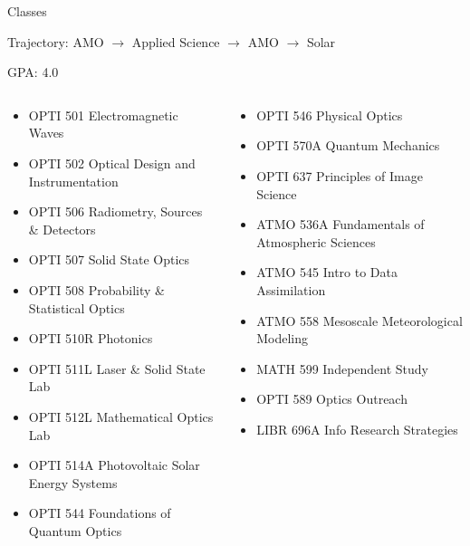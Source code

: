 \documentclass[aspectratio=169]{beamer}
\begin{document}
\begin{frame}{Classes}
\begin{minipage}[t]{.7\textwidth}
Trajectory: AMO $\rightarrow$ Applied Science $\rightarrow$ AMO
$\rightarrow$ Solar
\end{minipage}
\hfill
\begin{minipage}[t]{.2\textwidth}
\flushright
GPA: 4.0
\end{minipage}
\fontsize{8}{12}
\begin{columns}
\begin{column}{0.5 \textwidth}
\begin{itemize}
\item OPTI 501 Electromagnetic Waves
\item OPTI 502 Optical Design and Instrumentation
\item OPTI 506 Radiometry, Sources \& Detectors
\item OPTI 507 Solid State Optics
\item OPTI 508 Probability \& Statistical Optics
\item OPTI 510R Photonics
\item OPTI 511L Laser \& Solid State Lab
\item OPTI 512L Mathematical Optics Lab
\item OPTI 514A Photovoltaic Solar Energy Systems
\item OPTI 544 Foundations of Quantum Optics
\end{itemize}
\end{column}
\begin{column}{0.5 \textwidth}
\begin{itemize}
\item OPTI 546 Physical Optics
\item OPTI 570A Quantum Mechanics
\item OPTI 637 Principles of Image Science
\item ATMO 536A Fundamentals of Atmospheric Sciences
\item ATMO 545 Intro to Data Assimilation
\item ATMO 558 Mesoscale Meteorological Modeling
\item MATH 599 Independent Study
\item OPTI 589 Optics Outreach
\item LIBR 696A Info Research Strategies
\end{itemize}
\end{column}
\end{columns}
\end{frame}
\end{document}

